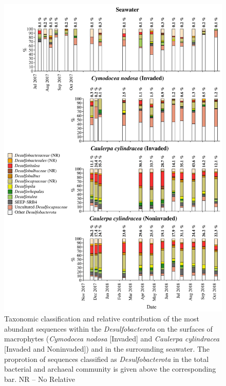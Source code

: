 \documentclass[12pt,]{article}
\begin{document}
\begin{figure}[H]

{\centering \includegraphics[width=0.85\linewidth]{../results/figures/desulfobacterota_bar_plot} 

}

\caption{Taxonomic classification and relative contribution of the most abundant sequences within the \textit{Desulfobacterota} on the surfaces of macrophytes (\textit{Cymodocea nodosa} [Invaded] and \textit{Caulerpa cylindracea} [Invaded and Noninvaded]) and in the surrounding seawater. The proprotion of sequences classified as \textit{Desulfobacterota} in the total bacterial and archaeal community is given above the corresponding bar. NR -- No Relative\label{desulfo}}\label{fig:unnamed-chunk-11}
\end{figure}
\end{document}

